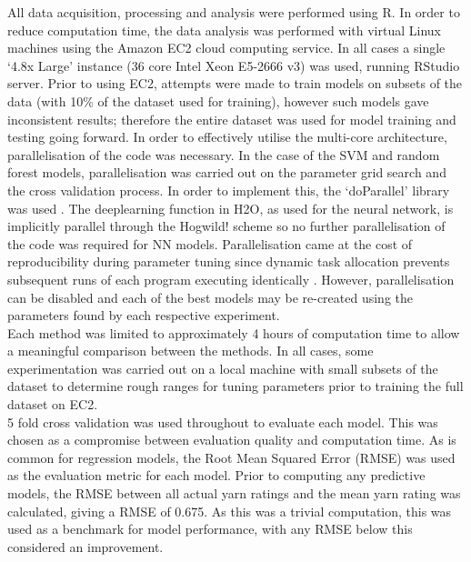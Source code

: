 \documentclass[journal]{IEEEtran}
\begin{document}
All data acquisition, processing and analysis were performed using R. In order to reduce computation time, the data analysis was performed with virtual Linux machines using the Amazon EC2 cloud computing service. In all cases a single ‘4.8x Large’ instance (36 core Intel Xeon E5-2666 v3) \cite{Amazon2017} was used, running RStudio server. Prior to using EC2, attempts were made to train models on subsets of the data (with 10\% of the dataset used for training), however such models gave inconsistent results; therefore the entire dataset was used for model training and testing going forward. In order to effectively utilise the multi-core architecture, parallelisation of the code was necessary. In the case of the SVM and random forest models, parallelisation was carried out on the parameter grid search and the cross validation process. In order to implement this, the ‘doParallel’ library was used \cite{Calaway2017}. The deeplearning function in H2O, as used for the neural network, is implicitly parallel through the Hogwild! scheme \cite{Niu2011} so no further parallelisation of the code was required for NN models. Parallelisation came at the cost of reproducibility during parameter tuning since dynamic task allocation prevents subsequent runs of each program executing identically \cite{h2o2015}. However, parallelisation can be disabled and each of the best models may be re-created using the parameters found by each respective experiment.\\

Each method was limited to approximately 4 hours of computation time to allow a meaningful comparison between the methods. In all cases, some experimentation was carried out on a local machine with small subsets of the dataset to determine rough ranges for tuning parameters prior to training the full dataset on EC2.\\

5 fold cross validation was used throughout to evaluate each model. This was chosen as a compromise between evaluation quality and computation time. As is common for regression models, the Root Mean Squared Error (RMSE) was used as the evaluation metric for each model. Prior to computing any predictive models, the RMSE between all actual yarn ratings and the mean yarn rating was calculated, giving a RMSE of 0.675. As this was a trivial computation, this was used as a benchmark for model performance, with any RMSE below this considered an improvement.
\end{document}
